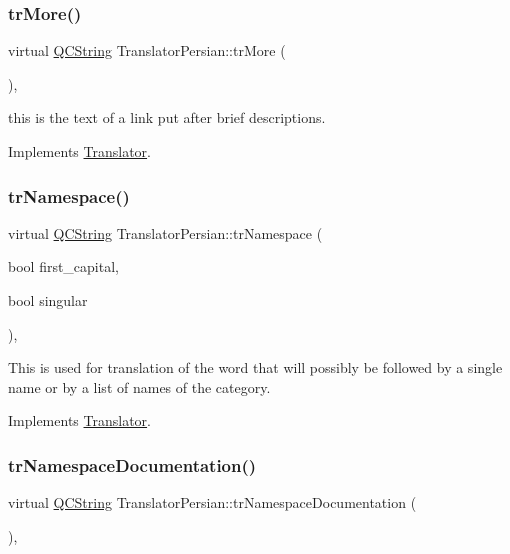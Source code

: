 \subsubsection{\texorpdfstring{trMore()}{trMore()}}
{\footnotesize\ttfamily virtual \mbox{\hyperlink{class_q_c_string}{Q\+C\+String}} Translator\+Persian\+::tr\+More (\begin{DoxyParamCaption}{ }\end{DoxyParamCaption})\hspace{0.3cm}{\ttfamily [inline]}, {\ttfamily [virtual]}}

this is the text of a link put after brief descriptions. 

Implements \mbox{\hyperlink{class_translator}{Translator}}.

\mbox{\label{class_translator_persian_ab5e3fcb4a155c69efc60839ae578c781}} 
\subsubsection{\texorpdfstring{trNamespace()}{trNamespace()}}
{\footnotesize\ttfamily virtual \mbox{\hyperlink{class_q_c_string}{Q\+C\+String}} Translator\+Persian\+::tr\+Namespace (\begin{DoxyParamCaption}\item[{bool}]{first\+\_\+capital,  }\item[{bool}]{singular }\end{DoxyParamCaption})\hspace{0.3cm}{\ttfamily [inline]}, {\ttfamily [virtual]}}

This is used for translation of the word that will possibly be followed by a single name or by a list of names of the category. 

Implements \mbox{\hyperlink{class_translator}{Translator}}.

\mbox{\label{class_translator_persian_ac2179ab0c1d7e3cce5f0d01a246ef087}} 
\subsubsection{\texorpdfstring{trNamespaceDocumentation()}{trNamespaceDocumentation()}}
{\footnotesize\ttfamily virtual \mbox{\hyperlink{class_q_c_string}{Q\+C\+String}} Translator\+Persian\+::tr\+Namespace\+Documentation (\begin{DoxyParamCaption}{ }\end{DoxyParamCaption})\hspace{0.3cm}{\ttfamily [inline]}, {\ttfamily [virtual]}}

